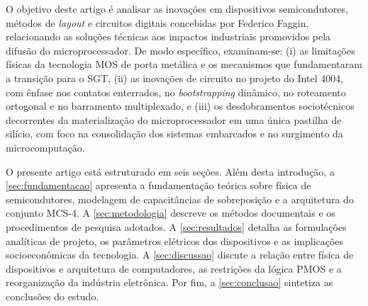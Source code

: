 O objetivo deste artigo é analisar as inovações em dispositivos semicondutores, métodos de \textit{layout} e circuitos digitais concebidas por Federico Faggin, relacionando as soluções técnicas aos impactos industriais promovidos pela difusão do microprocessador. De modo específico, examinam-se: (i) as limitações físicas da tecnologia MOS de porta metálica e os mecanismos que fundamentaram a transição para o SGT, (ii) as inovações de circuito no projeto do Intel 4004, com ênfase nos contatos enterrados, no \textit{bootstrapping} dinâmico, no roteamento ortogonal e no barramento multiplexado, e (iii) os desdobramentos sociotécnicos decorrentes da materialização do microprocessador em uma única pastilha de silício, com foco na consolidação dos sistemas embarcados e no surgimento da microcomputação.

O presente artigo está estruturado em seis seções. Além desta introdução, a \cref{sec:fundamentacao} apresenta a fundamentação teórica sobre física de semicondutores, modelagem de capacitâncias de sobreposição e a arquitetura do conjunto MCS-4. A \cref{sec:metodologia} descreve os métodos documentais e os procedimentos de pesquisa adotados. A \cref{sec:resultados} detalha as formulações analíticas de projeto, os parâmetros elétricos dos dispositivos e as implicações socioeconômicas da tecnologia. A \cref{sec:discussao} discute a relação entre física de dispositivos e arquitetura de computadores, as restrições da lógica PMOS e a reorganização da indústria eletrônica. Por fim, a \cref{sec:conclusao} sintetiza as conclusões do estudo.